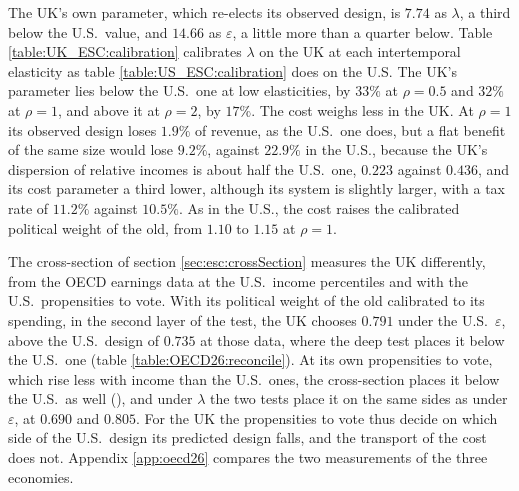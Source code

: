 

The UK's own parameter, which re-elects its observed design, is $7.74$ as $\lambda$, a third below the U.S.\ value, and $14.66$ as $\varepsilon$, a little more than a quarter below. Table \ref{table:UK_ESC:calibration} calibrates $\lambda$ on the UK at each intertemporal elasticity as table \ref{table:US_ESC:calibration} does on the U.S\@. The UK's parameter lies below the U.S.\ one at low elasticities, by $33\%$ at $\rho = 0.5$ and $32\%$ at $\rho = 1$, and above it at $\rho = 2$, by $17\%$. The cost weighs less in the UK. At $\rho = 1$ its observed design loses $1.9\%$ of revenue, as the U.S.\ one does, but a flat benefit of the same size would lose $9.2\%$, against $22.9\%$ in the U.S., because the UK's dispersion of relative incomes is about half the U.S.\ one, $0.223$ against $0.436$, and its cost parameter a third lower, although its system is slightly larger, with a tax rate of $11.2\%$ against $10.5\%$. As in the U.S., the cost raises the calibrated political weight of the old, from $1.10$ to $1.15$ at $\rho = 1$.



The cross-section of section \ref{sec:esc:crossSection} measures the UK differently, from the OECD earnings data at the U.S.\ income percentiles and with the U.S.\ propensities to vote. With its political weight of the old calibrated to its spending, in the second layer of the test, the UK chooses $0.791$ under the U.S.\ $\varepsilon$, above the U.S.\ design of $0.735$ at those data, where the deep test places it below the U.S.\ one (table \ref{table:OECD26:reconcile}). At its own propensities to vote, which rise less with income than the U.S.\ ones, the cross-section places it below the U.S.\ as well (), and under $\lambda$ the two tests place it on the same sides as under $\varepsilon$, at $0.690$ and $0.805$. For the UK the propensities to vote thus decide on which side of the U.S.\ design its predicted design falls, and the transport of the cost does not. Appendix \ref{app:oecd26} compares the two measurements of the three economies.

\FloatBarrier
